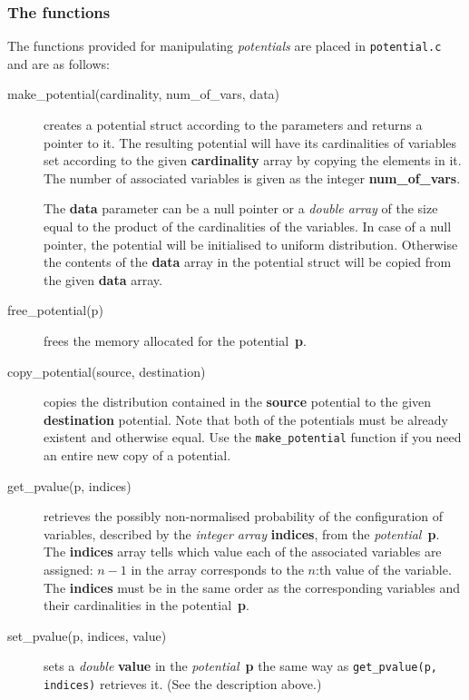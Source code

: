 \documentclass[12pt,a4paper]{report}
\newcommand{\cdatatype}[1]{{\it #1}}
\newcommand{\cfilename}[1]{\texttt{#1}}
\newcommand{\cparameter}[1]{\textbf{#1}}
\newcommand{\cstructfield}[1]{\textbf{#1}}
\newcommand{\cfunction}[1]{\texttt{#1}}
\begin{document}
\subsubsection{The functions}
The functions provided for manipulating \cdatatype{potentials} are 
placed in \cfilename{potential.c} and are as follows:
\begin{description}
\item[make\_potential(cardinality, num\_of\_vars, data)] creates a
potential struct according to the parameters and returns a pointer
to it. The resulting potential will have its cardinalities of
variables set according to the given \cparameter{cardinality} array by
copying the elements in it. The number of associated variables is
given as the integer \cparameter{num\_of\_vars}. 

The \cparameter{data} parameter can be a null pointer or a 
\cdatatype{double array} of the size equal to the product of the 
cardinalities of the variables. In case of a null pointer, the
potential will be initialised to uniform distribution. Otherwise the 
contents of the \cstructfield{data} array in the potential struct will
be copied from the given \cparameter{data} array.

\item[free\_potential(p)] frees the memory allocated for the
potential~\cparameter{p}. 

\item[copy\_potential(source, destination)] copies the distribution
contained in the \cparameter{source} potential to the given
\cparameter{destination} potential. Note that both of the potentials must
be already existent and otherwise equal. Use the 
\cfunction{make\_potential} function if you need an entire new copy of 
a potential.

\item[get\_pvalue(p, indices)] retrieves the possibly non-normalised
probability of the configuration of variables, described by the 
\cdatatype{integer array} \cparameter{indices}, from the 
\cdatatype{potential}~\cparameter{p}. The \cparameter{indices} array 
tells which value each of the associated variables are assigned: 
$n-1$ in the array corresponds to the $n$:th value of the variable. 
The \cparameter{indices} must be in the same order as the corresponding 
variables and their cardinalities in the potential~\cparameter{p}. 

\item[set\_pvalue(p, indices, value)] sets a \cdatatype{double}
\cparameter{value} in the \cdatatype{potential}~\cparameter{p} the same 
way as \cfunction{get\_pvalue(p, indices)} retrieves it. 
(See the description above.)


\end{description}
\end{document}
